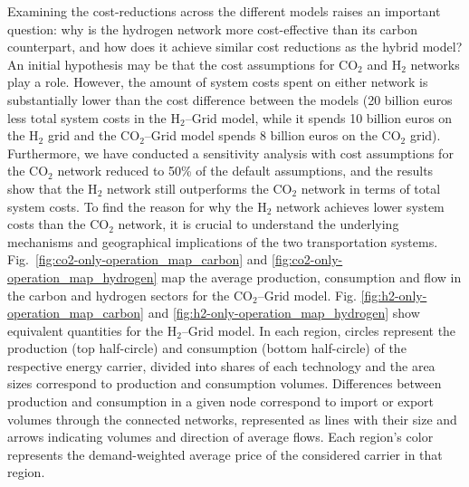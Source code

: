\documentclass[twocolumn]{article}
\newcommand{\carbon}{CO$_2$}
\newcommand{\hydrogen}{H$_2$}
\newcommand{\carbongrid}{\carbon{}--Grid}
\newcommand{\hydrogengrid}{\hydrogen{}--Grid}
\begin{document}
Examining the cost-reductions across the different models raises an important question: why is the hydrogen network more cost-effective than its carbon counterpart, and how does it achieve similar cost reductions as the hybrid model? An initial hypothesis may be that the cost assumptions for \carbon{}
 and \hydrogen{} networks play a role. However, the amount of system costs spent on either network is substantially lower than the cost difference between the models (20 billion euros less total system costs in the \hydrogengrid{} model, while it spends 10 billion euros on the \hydrogen{} grid and the \carbongrid{} model spends 8 billion euros on the \carbon{} grid). Furthermore, we have conducted a sensitivity analysis with cost assumptions for the \carbon{} network reduced to 50\% of the default assumptions, and the results show that the \hydrogen{} network still outperforms the \carbon{} network in terms of total system costs.
To find the reason for why the \hydrogen{} network achieves lower system costs than the \carbon{} network, it is crucial to understand the underlying mechanisms and geographical implications of the two transportation systems. Fig.~\ref{fig:co2-only-operation_map_carbon} and \ref{fig:co2-only-operation_map_hydrogen} map the average production, consumption and flow in the carbon and hydrogen sectors for the \carbongrid{} model. Fig. \ref{fig:h2-only-operation_map_carbon} and \ref{fig:h2-only-operation_map_hydrogen} show equivalent quantities for the \hydrogengrid{} model. In each region, circles represent the production (top half-circle) and consumption (bottom half-circle) of the respective energy carrier, divided into shares of each technology and the area sizes correspond to production and consumption volumes. Differences between production and consumption in a given node correspond to import or export volumes through the connected networks, represented as lines with their size and arrows indicating volumes and direction of average flows. Each region's color represents the demand-weighted average price of the considered carrier in that region.
\end{document}
